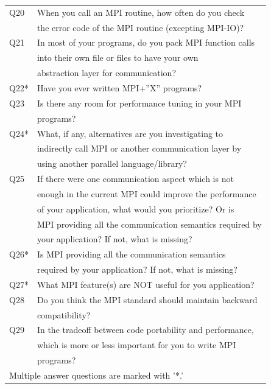 \documentclass[conference,10pt,letterpaper]{IEEEtran}
\begin{document}
\begin{table}
\begin{center}
\begin{tabular}{l|l}
  \hline
  Q20  & When you call an MPI routine, how often do you check \\
  & the error code of the MPI routine  (excepting MPI-IO)? \\
  \hline
  Q21  & In most of your programs, do you pack MPI function calls \\
  & into their own file or files to have your own \\
  & abstraction layer for communication? \\
  \hline
  Q22* & Have you ever written MPI+''X'' programs? \\
  \hline
  Q23  & Is there any room for performance tuning in your MPI \\
  & programs? \\
  \hline
  Q24* & What, if any, alternatives are you investigating to \\
  & indirectly call MPI or another communication layer by \\
  & using another parallel language/library? \\
  \hline
  Q25  & If there were one communication aspect which is not \\
  & enough in the current MPI could improve the performance \\
  & of your application, what would you prioritize?  Or is \\
  & MPI providing all the communication semantics required by \\
  & your application?  If not, what is missing? \\
  \hline
  Q26* & Is MPI providing all the communication semantics \\
  & required by your application? If not, what is missing? \\
  \hline
  Q27* & What MPI feature(s) are NOT useful for you application? \\
  \hline
  Q28  & Do you think the MPI standard should maintain backward \\
  & compatibility? \\
  \hline
  Q29  & In the tradeoff between code portability and performance, \\
  & which is more or less important for you to write MPI \\
  & programs? \\
  \hline
  \multicolumn{2}{l}{Multiple answer questions are marked with '*.'} \\
\end{tabular}
\end{center}
\end{table}
\end{document}
